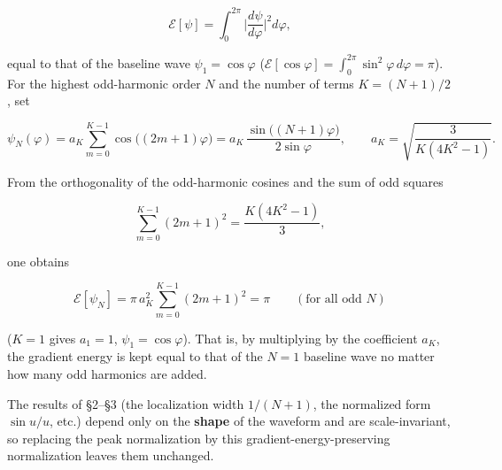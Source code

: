 \documentclass[
]{ltjsarticle}
\begin{document}
\[
\mathcal{E}[\psi]=\int_0^{2\pi}\Big|\frac{d\psi}{d\varphi}\Big|^2 d\varphi,
\]

equal to that of the baseline wave \(\psi_1=\cos\varphi\)
(\(\mathcal{E}[\cos\varphi]=\int_0^{2\pi}\sin^2\varphi\,d\varphi=\pi\)).
For the highest odd-harmonic order \(N\) and the number of terms
\(K=(N+1)/2\), set

\[
\psi_N(\varphi)=a_K\sum_{m=0}^{K-1}\cos\!\big((2m+1)\varphi\big)
=a_K\,\frac{\sin\!\big((N+1)\varphi\big)}{2\sin\varphi},
\qquad
a_K=\sqrt{\frac{3}{K(4K^2-1)}}.
\]

From the orthogonality of the odd-harmonic cosines and the sum of odd
squares

\[
\sum_{m=0}^{K-1}(2m+1)^2=\frac{K(4K^2-1)}{3},
\]

one obtains

\[
\mathcal{E}[\psi_N]=\pi\,a_K^2\sum_{m=0}^{K-1}(2m+1)^2=\pi
\qquad(\text{for all odd }N)
\]

(\(K=1\) gives \(a_1=1\), \(\psi_1=\cos\varphi\)). That is, by
multiplying by the coefficient \(a_K\), the gradient energy is kept
equal to that of the \(N=1\) baseline wave no matter how many odd
harmonics are added.

The results of §2--§3 (the localization width \(1/(N+1)\), the
normalized form \(\sin u/u\), etc.) depend only on the \textbf{shape} of
the waveform and are scale-invariant, so replacing the peak
normalization by this gradient-energy-preserving normalization leaves
them unchanged.
\end{document}
